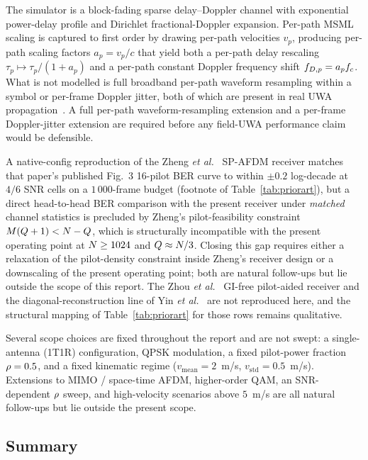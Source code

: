 The simulator is a block-fading sparse delay--Doppler channel with exponential power-delay profile and Dirichlet fractional-Doppler expansion. Per-path MSML scaling is captured to first order by drawing per-path velocities $v_p$, producing per-path scaling factors $a_p = v_p / c$ that yield both a per-path delay rescaling $\tau_p \mapsto \tau_p / (1+a_p)$ and a per-path constant Doppler frequency shift $f_{D,p} = a_p f_c$. What is not modelled is full broadband per-path waveform resampling within a symbol or per-frame Doppler jitter, both of which are present in real UWA propagation~\cite{zhou2024msmlafdm}. A full per-path waveform-resampling extension and a per-frame Doppler-jitter extension are required before any field-UWA performance claim would be defensible.

A native-config reproduction of the Zheng \emph{et al.}~\cite{qing2024spafdm} SP-AFDM receiver matches that paper's published Fig.~3 16-pilot BER curve to within $\pm 0.2$ log-decade at $4/6$ SNR cells on a $1\,000$-frame budget (footnote of Table~\ref{tab:priorart}), but a direct head-to-head BER comparison with the present receiver under \emph{matched} channel statistics is precluded by Zheng's pilot-feasibility constraint $M(Q+1) < N - Q$, which is structurally incompatible with the present operating point at $N \geq 1024$ and $Q \approx N/3$. Closing this gap requires either a relaxation of the pilot-density constraint inside Zheng's receiver design or a downscaling of the present operating point; both are natural follow-ups but lie outside the scope of this report. The Zhou \emph{et al.}~\cite{zhao2024gifreeafdm} GI-free pilot-aided receiver and the diagonal-reconstruction line of Yin \emph{et al.}~\cite{yin2024drceafdm} are not reproduced here, and the structural mapping of Table~\ref{tab:priorart} for those rows remains qualitative.

Several scope choices are fixed throughout the report and are not swept: a single-antenna (1T1R) configuration, QPSK modulation, a fixed pilot-power fraction $\rho = 0.5$, and a fixed kinematic regime ($v_\text{mean} = 2$~m/s, $v_\text{std} = 0.5$~m/s). Extensions to MIMO / space-time AFDM, higher-order QAM, an SNR-dependent $\rho$ sweep, and high-velocity scenarios above $5$~m/s are all natural follow-ups but lie outside the present scope.

\subsection{Summary}

